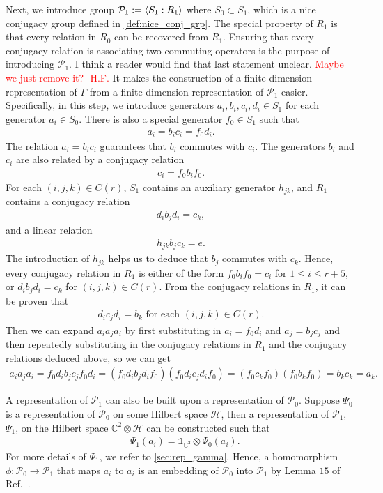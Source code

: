 \documentclass[11pt,letterpaper]{article}
\newcommand{\x}{\otimes}
\DeclarePairedDelimiter{\ip}{\langle}{\rangle}
\newcommand{\C}{\mathbb{C}}
\newcommand{\calH}{\mathcal{H}}
\newcommand{\1}{\mathbb{1}}
\newcommand{\Pg}{\mathcal{P}}
\def\carl#1{{\color{blue} #1}}
\newcommand{\hfc}[1]{\textcolor{red}{#1 -H.F.}}
\theoremstyle{definition}
\begin{document}
Next, we introduce group $\Pg_1 := \ip{S_1: R_1}$ where $S_0 \subset S_1$, which is a nice conjugacy group defined in \cref{def:nice_conj_grp}.
The special property of $R_1$ is that every relation in $R_0$ can be recovered from $R_1$.
Ensuring that every conjugacy relation is associating two commuting operators is the purpose of introducing $\Pg_1$. \carl{I think a reader would find that last statement unclear.}
\hfc{Maybe we just remove it?}
It makes the construction of a finite-dimension representation of $\Gamma$ from
a finite-dimension representation of $\Pg_1$ easier.
Specifically, in this step, we introduce generators $a_i, b_i, c_i, d_i \in S_1$
for each generator $a_i \in S_0$.
There is also a special generator $f_0 \in S_1$ such that
\begin{align*}
    a_i = b_ic_i = f_0d_i. 
\end{align*}
The relation $a_i = b_ic_i$ guarantees that $b_i$ commutes
with $c_i$.
The generators $b_i$ and $c_i$ are also related by a conjugacy relation
\begin{align*}
    c_i = f_0 b_i f_0. 
\end{align*}
For each $(i,j,k) \in C(r)$, 
$S_1$ contains an auxiliary generator $h_{jk}$, and
$R_1$ 
contains a conjugacy relation 
\begin{align*}
    d_ib_jd_i = c_k,
\end{align*}
and a linear relation
\begin{align*}
    h_{jk}b_jc_k = e.
\end{align*}
The introduction of $h_{jk}$ helps us to deduce that 
$b_j$ commutes with $c_k$.
Hence, every conjugacy relation in $R_1$ is either of the form
$f_0b_if_0 = c_i$ for $1 \leq i \leq r+5$, or
$d_ib_jd_i = c_k$ for $(i,j,k) \in C(r)$.
From the conjugacy relations in $R_1$, it can be proven that
\begin{align*}
    d_ic_jd_i = b_k \text{ for each } (i,j,k) \in C(r).
\end{align*}
Then we can expand $a_ia_ja_i$ by first substituting in $a_i = f_0 d_i$ and $a_j = b_jc_j$ and then repeatedly substituting in the conjugacy relations in $R_1$ and 
the conjugacy relations deduced above, so we can get
\begin{align*}
    a_ia_ja_i = f_0 d_i b_jc_j f_0 d_i
		= (f_0 d_i b_j d_i f_0)(f_0 d_i c_j d_i f_0) 
		= (f_0 c_k f_0)(f_0 b_k f_0) 
		= b_k c_k = a_k.
\end{align*}


A representation of $\Pg_1$ can also be built upon a representation of $\Pg_0$.
Suppose $\Psi_0$ is a representation of $\Pg_0$ on some Hilbert space $\calH$, then 
 a representation of $\Pg_1$, $\Psi_1$, on the Hilbert space $\C^2 \x \calH$ can
 be constructed such that
\begin{align*}
    &\Psi_1(a_i) = \1_{\C^2} \x \Psi_0(a_i).
\end{align*}
For more details of $\Psi_1$, we refer to \cref{sec:rep_gamma}.
Hence, a homomorphism $\phi: \Pg_0 \rightarrow \Pg_1$ that 
maps $a_i$ to $a_i$ is an embedding of $\Pg_0$ into $\Pg_1$
by Lemma $15$ of Ref.~\cite{slofstra2017}.
\end{document}
